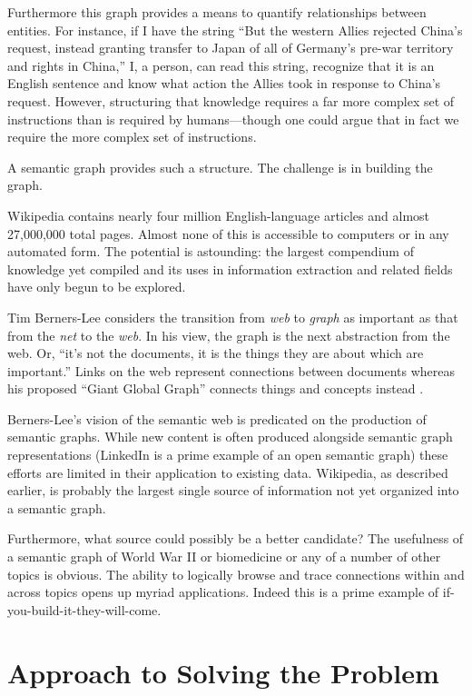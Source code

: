 Furthermore this graph provides a means to quantify relationships between entities.  For instance, if I have the string ``But the western Allies rejected China's request, instead granting transfer to Japan of all of Germany's pre-war territory and rights in China,'' I, a person, can read this string, recognize that it is an English sentence and know what action the Allies took in response to China's request.  However, structuring that knowledge requires a far more complex set of instructions than is required by humans---though one could argue that in fact we require the more complex set of instructions.

A semantic graph provides such a structure.  The challenge is in building the graph.

Wikipedia contains nearly four million English-language articles and almost 27,000,000 total pages.  Almost none of this is accessible to computers or in any automated form.  The potential is astounding: the largest compendium of knowledge yet compiled and its uses in information extraction and related fields have only begun to be explored.

Tim Berners-Lee considers the transition from \emph{web} to \emph{graph} as important as that from the \emph{net} to the \emph{web}.  In his view, the graph is the next abstraction from the web.  Or, ``it's not the documents, it is the things they are about which are important.''  Links on the web represent connections between documents whereas his proposed ``Giant Global Graph'' connects things and concepts instead \cite{timbl}.

Berners-Lee's vision of the semantic web is predicated on the production of semantic graphs.  While new content is often produced alongside semantic graph representations (LinkedIn is a prime example of an open semantic graph) these efforts are limited in their application to existing data.  Wikipedia, as described earlier, is probably the largest single source of information not yet organized into a semantic graph.

Furthermore, what source could possibly be a better candidate?  The usefulness of a semantic graph of World War II or biomedicine or any of a number of other topics is obvious.  The ability to logically browse and trace connections within and across topics opens up myriad applications.  Indeed this is a prime example of if-you-build-it-they-will-come.  

\chapter{Approach to Solving the Problem}

